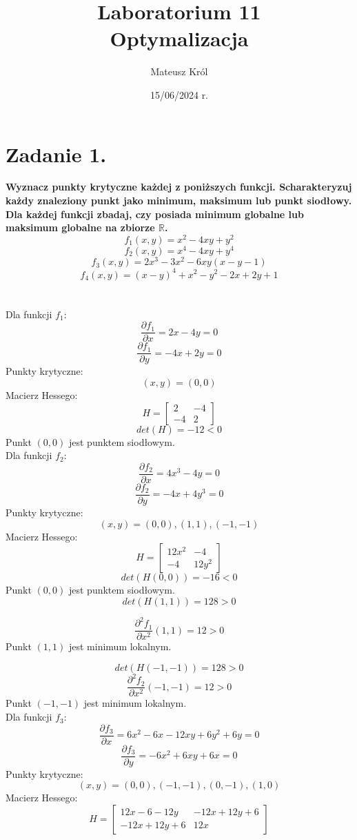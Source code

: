 \documentclass{article}
\title{%
Laboratorium 11\\
  \huge Optymalizacja}
\author{Mateusz Król}
\date{15/06/2024 r.}
\begin{document}
\maketitle

 
\section*{Zadanie 1.}
\textbf{Wyznacz punkty krytyczne każdej z poniższych funkcji.
Scharakteryzuj każdy znaleziony punkt jako minimum, maksimum lub punkt siodłowy.
Dla każdej funkcji zbadaj, czy posiada minimum globalne lub maksimum globalne na zbiorze $\mathbb{R}$.}
$$f_1(x, y) = x^2 - 4xy + y^2$$
$$f_2(x, y) = x^4 - 4xy + y^4$$
$$f_3(x, y) = 2x^3 - 3x^2 -6xy(x-y-1)$$
$$f_4(x, y) = (x-y)^4 + x^2 - y^2 - 2x + 2y +1$$
\\\\
Dla funkcji $f_1$:
$$\frac{\partial f_1}{\partial x} = 2x-4y = 0$$
$$\frac{\partial f_1}{\partial y} = -4x+2y = 0$$
Punkty krytyczne:
$$(x, y) = (0, 0)$$
Macierz Hessego:
$$H = \begin{bmatrix}
  2 & -4 \\
  -4 & 2 
\end{bmatrix}$$
$$det(H) = -12 < 0$$
Punkt $(0, 0)$ jest punktem siodłowym. \\


Dla funkcji $f_2$:
$$\frac{\partial f_2}{\partial x} = 4x^3-4y = 0$$
$$\frac{\partial f_2}{\partial y} = -4x+4y^3 = 0$$
Punkty krytyczne:
$$(x, y) = (0, 0), (1, 1), (-1, -1)$$
Macierz Hessego:
$$H = \begin{bmatrix}
  12x^2 & -4 \\
  -4 & 12y^2
\end{bmatrix}$$
$$det(H(0, 0)) = -16 < 0$$
Punkt $(0, 0)$ jest punktem siodłowym.
$$det(H(1, 1)) = 128 > 0$$

$$\frac{\partial^2 f_1}{\partial x^2}(1, 1) = 12 > 0$$
Punkt $(1, 1)$ jest minimum lokalnym.

$$det(H(-1, -1)) = 128 > 0$$
$$\frac{\partial^2 f_2}{\partial x^2}(-1, -1) = 12 > 0$$
Punkt $(-1, -1)$ jest minimum lokalnym. \\

Dla funkcji $f_3$:
$$\frac{\partial f_3}{\partial x} = 6x^2-6x-12xy+6y^2+6y = 0$$
$$\frac{\partial f_3}{\partial y} = -6x^2+6xy+6x = 0$$
Punkty krytyczne:
$$(x, y) = (0, 0), (-1, -1), (0, -1), (1, 0) $$
Macierz Hessego:
$$H = \begin{bmatrix}
  12x-6-12y & -12x+12y+6 \\
  -12x+12y+6 & 12x
\end{bmatrix}$$
\end{document}
